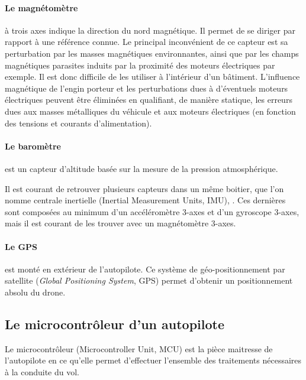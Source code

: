  \paragraph{Le magnétomètre} à trois axes indique la direction du nord magnétique. Il permet de se diriger par rapport à une référence connue. Le principal inconvénient de ce capteur est sa perturbation par les masses magnétiques environnantes, ainsi que par les champs magnétiques parasites induits par la proximité des moteurs électriques par exemple. Il est donc difficile de les utiliser à l'intérieur d'un bâtiment. L'influence magnétique de l'engin porteur et les perturbations dues à d'éventuels moteurs électriques peuvent être éliminées en qualifiant, de manière statique, les erreurs dues aux masses métalliques du véhicule et aux moteurs électriques (en fonction des tensions et courants d'alimentation).

 \paragraph{Le baromètre}est un capteur d'altitude basée sur la mesure de la pression atmosphérique.

 Il est courant de retrouver plusieurs capteurs dans un même boitier, que l'on nomme centrale inertielle (Inertial Measurement Units, IMU), . Ces dernières sont composées au minimum d'un accéléromètre 3-axes et d'un gyroscope 3-axes, mais il est courant de les trouver avec un magnétomètre 3-axes. 


 \paragraph{Le GPS}est monté en extérieur de l'autopilote. Ce système de géo-positionnement par satellite (\textit{Global Positioning System}, GPS)  permet d'obtenir un positionnement absolu du drone. 

 \subsection{Le microcontrôleur d'un autopilote}
 \label{sec:micoctrl}
 Le microcontrôleur (Microcontroller Unit, MCU)  est la pièce maitresse de l'autopilote en ce qu'elle permet d'effectuer l'ensemble des traitements nécessaires à la conduite du vol.

